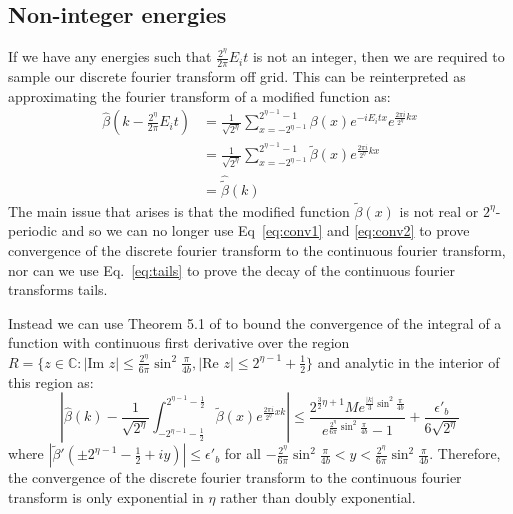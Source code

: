 \documentclass[aps,floatfix,10pt,amssymb,amsfont,amsmath,superscriptaddress,float,nofootinbib,longbibliography,nobalancelastpage,twocolumn]{revtex4-2}
\begin{document}
\subsection{Non-integer energies}
If we have any energies such that $\frac{2^{\eta}}{2\pi}E_it$ is not an integer, then we are required to sample our discrete fourier transform off grid. This can be reinterpreted as approximating the fourier transform of a modified function as:
\begin{align}
    \hat \beta(k -\frac{2^{\eta}}{2\pi}E_it) &= \frac{1}{\sqrt{2^{\eta}}} \sum_{x=-2^{\eta-1}}^{2^{\eta-1}-1} \beta(x) e^{-iE_it x}e^{\frac{2\pi i}{2^{\eta}} kx}\\
    &= \frac{1}{\sqrt{2^{\eta}}} \sum_{x=-2^{\eta-1}}^{2^{\eta-1}-1} \tilde\beta(x)e^{\frac{2\pi i}{2^{\eta}} kx}\\
    &= \hat{\tilde\beta}(k)
\end{align}
The main issue that arises is that the modified function $\tilde\beta(x)$ is not real or $2^{\eta}$-periodic and so we can no longer use Eq~\eqref{eq:conv1} and \eqref{eq:conv2} to prove convergence of the discrete fourier transform to the continuous fourier transform, nor can we use Eq.~\ref{eq:tails} to prove the decay of the continuous fourier transforms tails. 

Instead we can use Theorem 5.1 of \cite{javed2014trapezoidal} to bound the convergence of the integral of a function with continuous first derivative over the region $R = \{z \in \mathbb{C}: |\text{Im } z| \leq  \frac{2^{\eta}}{6\pi}\sin^2\frac{\pi}{4b}, |\text{Re } z| \leq 2^{\eta-1}+\frac{1}{2}\}$ and analytic in the interior of this region as:
\begin{equation}
    \left| \hat \beta(k) - \frac{1}{\sqrt{2^{\eta}}} \int_{-2^{\eta-1}-\frac{1}{2}}^{2^{\eta-1}-\frac{1}{2}}\tilde\beta(x)e^{\frac{2\pi i}{2^{\eta}}xk} \right| \leq \frac{2^{\frac{3}{2}\eta+1} Me^{\frac{|k|}{3}\sin^2 \frac{\pi}{4b}}}{e^{\frac{2^{\eta}}{6\pi}\sin^2 \frac{\pi}{4b}}-1} + \frac{\epsilon'_{b}}{6\sqrt{2^{\eta}}}
\end{equation}
where $|\tilde\beta'(\pm2^{\eta-1}-\frac{1}{2}+iy)| \leq \epsilon'_{b}$ for all $-\frac{2^{\eta}}{6\pi}\sin^2\frac{\pi}{4b}<y<\frac{2^{\eta}}{6\pi}\sin^2\frac{\pi}{4b}$. Therefore, the convergence of the discrete fourier transform to the continuous fourier transform is only exponential in $\eta$ rather than doubly exponential.
\end{document}
